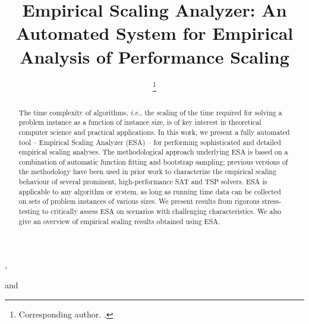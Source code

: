 \documentclass[aic]{iosart2x}
\newcommand{\ie}{\emph{i.e.}}
\begin{document}
\begin{frontmatter}

\title{Empirical Scaling Analyzer: \newline An Automated System for Empirical Analysis of Performance Scaling}


\author[A]{ },
\author[A]{ }
and
\author[B,A]{ %
\thanks{Corresponding author. .}}
\address[A]{Department of Computer Science, ,
BC, }
\address[B]{LIACS, , }

\begin{abstract}
The time complexity of algorithms, \ie, the scaling of the time required for solving a problem instance as a function of instance size, is of key interest in theoretical computer science and practical applications. In this work, we present a fully automated tool -- Empirical Scaling Analyzer (ESA) -- for performing sophisticated and detailed empirical scaling analyses. The methodological approach underlying ESA is based on a combination of automatic function fitting and bootstrap sampling; previous versions of the methodology have been used in prior work to characterize the empirical scaling behaviour of several prominent, high-performance SAT and TSP solvers. ESA is applicable to any algorithm or system, as long as running time data can be collected on sets of problem instances of various sizes. We present results from rigorous stress-testing to critically assess ESA on scenarios with challenging characteristics. 
We also give an overview of empirical scaling results obtained using ESA.
\end{abstract}

\begin{keyword}
\end{keyword}

\end{frontmatter}
\end{document}

